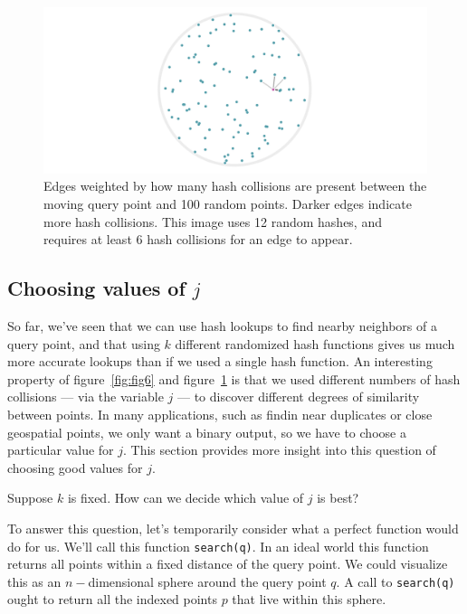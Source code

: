 \documentclass[20pt,]{extarticle}
\begin{document}
\begin{figure}
\centering
\includegraphics{images/image8b@2x.gif}
\caption{Edges weighted by how many hash collisions are present between
the moving query point and 100 random points. Darker edges indicate more
hash collisions. This image uses 12 random hashes, and requires at least
6 hash collisions for an edge to appear.}\label{fig:fig8b}
\end{figure}

\subsection{\texorpdfstring{Choosing values of
\(j\)}{Choosing values of j}}\label{choosing-values-of-j}

So far, we've seen that we can use hash lookups to find nearby neighbors
of a query point, and that using \(k\) different randomized hash
functions gives us much more accurate lookups than if we used a single
hash function. An interesting property of figure~\ref{fig:fig6} and
figure~\ref{fig:fig8b} is that we used different numbers of hash
collisions --- via the variable \(j\) --- to discover different degrees
of similarity between points. In many applications, such as findin near
duplicates or close geospatial points, we only want a binary output, so
we have to choose a particular value for \(j\). This section provides
more insight into this question of choosing good values for \(j\).

Suppose \(k\) is fixed. How can we decide which value of \(j\) is best?

To answer this question, let's temporarily consider what a perfect
function would do for us. We'll call this function \texttt{search(q)}.
In an ideal world this function returns all points within a fixed
distance of the query point. We could visualize this as an
\(n-\)dimensional sphere around the query point \(q\). A call to
\texttt{search(q)} ought to return all the indexed points \(p\) that
live within this sphere.
\end{document}
